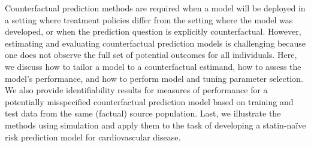 


Counterfactual prediction methods are required when a model will be deployed in a setting where treatment policies differ from the setting where the model was developed, or when the prediction question is explicitly counterfactual. However, estimating and evaluating counterfactual prediction models is challenging because one does not observe the full set of potential outcomes for all individuals. Here, we discuss how to tailor a model to a counterfactual estimand, how to assess the model's performance, and how to perform model and tuning parameter selection. We also provide identifiability results for measures of performance for a potentially misspecified counterfactual prediction model based on training and test data from the same (factual) source population. Last, we illustrate the methods using simulation and apply them to the task of developing a statin-na\"{i}ve risk prediction model for cardiovascular disease. \\

